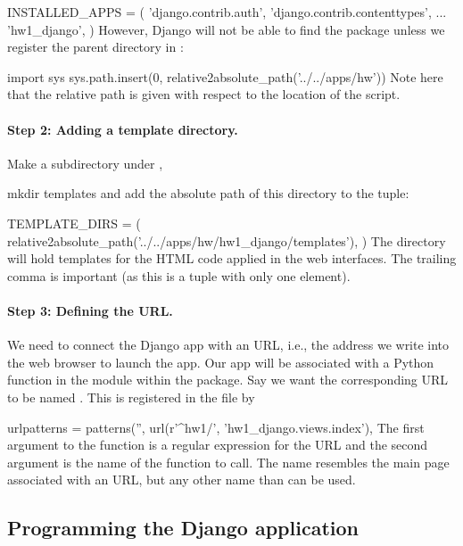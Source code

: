 \documentclass[%
oneside,                 %
final,                   %
10pt]{article}
\begin{document}
{{\bpycod
INSTALLED_APPS = (
    'django.contrib.auth',
    'django.contrib.contenttypes',
    ...
    'hw1_django',
)
\epycod
However, Django will not be able to find the package 
unless we register the parent directory in :

\bpycod
import sys
sys.path.insert(0, relative2absolute_path('../../apps/hw'))
\epycod
Note here that the relative path is given with respect to the
location of the  script.

\paragraph{Step 2: Adding a template directory.}
Make a subdirectory  under ,

\bsys
mkdir templates
\esys
and add the absolute path of this directory to the  tuple:

\bpycod
TEMPLATE_DIRS = (
    relative2absolute_path('../../apps/hw/hw1_django/templates'),
)
\epycod
The  directory will hold templates for the HTML code applied
in the web interfaces. The trailing comma is important (as this is
a tuple with only one element).

\paragraph{Step 3: Defining the URL.}
We need to connect the Django app with
an URL, i.e., the address we write into the web browser to launch the
app. Our app will be associated with a Python function 
in the  module within the  package.
Say we want the corresponding URL to
be named . This is registered in the  file
by

\bpycod
urlpatterns = patterns('',
    url(r'^hw1/', 'hw1_django.views.index'),
\epycod
The first argument to the  function is a regular expression for
the URL and the second argument is the name of the function to call.
The name  resembles the  main page associated
with an URL, but any other name than  can be used.

\subsection{Programming the Django application}



}}
\end{document}
